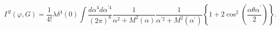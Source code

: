 \begin{equation}
\Gamma^{2}(\varphi,G)=\frac{1}{4!}\lambda\delta^{4}(0)\int \frac{d\alpha^{4}d\alpha^{\prime4}}{(2\pi)^{8}}%
\frac{1}{\alpha^{2}+M^{2}(\alpha)}\frac{1}{\alpha^{\prime
2}+M^{2}(\alpha^{\prime})}\left\{  1+2\cos^{2}(\frac{\alpha\theta
\alpha^{\prime}}{2})\right\}  . \label{G2}%
\end{equation}

